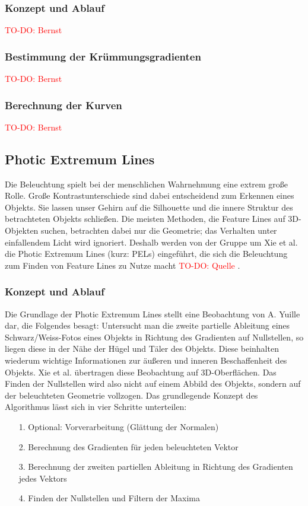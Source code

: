 \documentclass{paperStyle}
\newcommand\todo[1]{\textcolor{red}{#1}}
\begin{document}
\subsubsection{Konzept und Ablauf}

\todo{TO-DO: Bernst}
\subsubsection{Bestimmung der Krümmungsgradienten}
\todo{TO-DO: Bernst}
\subsubsection{Berechnung der Kurven}
\todo{TO-DO: Bernst}
\subsection{Photic Extremum Lines}
Die Beleuchtung spielt bei der menschlichen Wahrnehmung eine extrem große Rolle. Große Kontrastunterschiede sind dabei entscheidend zum Erkennen eines Objekts. Sie lassen unser Gehirn auf die Silhouette und die innere Struktur des betrachteten Objekts schließen. Die meisten Methoden, die Feature Lines auf 3D-Objekten suchen, betrachten dabei nur die Geometrie; das Verhalten unter einfallendem Licht wird ignoriert. Deshalb werden von der Gruppe um Xie et al. die Photic Extremum Lines (kurz: PELs) eingeführt, die sich die Beleuchtung zum Finden von Feature Lines zu Nutze macht \todo{TO-DO: Quelle} .
\label{pellabel} 
\subsubsection{Konzept und Ablauf}
\label{defpel}
Die Grundlage der Photic Extremum Lines stellt eine Beobachtung von A. Yuille dar, die Folgendes besagt: Untersucht man die zweite partielle Ableitung eines Schwarz/Weiss-Fotos eines Objekts in Richtung des Gradienten auf Nullstellen, so liegen diese in der Nähe der Hügel und Täler des Objekts. Diese beinhalten wiederum wichtige Informationen zur äußeren und inneren Beschaffenheit des Objekts. Xie et al. übertragen diese Beobachtung auf 3D-Oberflächen. Das Finden der Nullstellen wird also nicht auf einem Abbild des Objekts, sondern auf der beleuchteten Geometrie vollzogen.
Das grundlegende Konzept des Algorithmus lässt sich in vier Schritte unterteilen:
\begin{itemize}
\item[1.] Optional: Vorverarbeitung (Glättung der Normalen)
\item[2.] Berechnung des Gradienten für jeden beleuchteten Vektor
\item[3.] Berechnung der zweiten partiellen Ableitung in Richtung des Gradienten jedes Vektors
\item[4.] Finden der Nullstellen und Filtern der Maxima

\end{itemize} 
\end{document}
